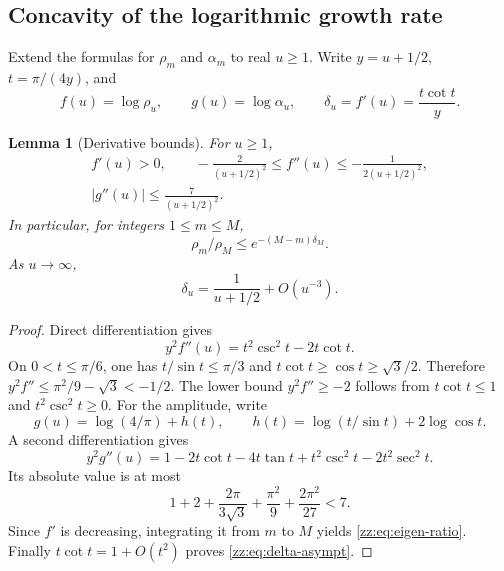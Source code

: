 \documentclass[11pt,a4paper]{article}
\newtheorem{lemma}[theorem]{Lemma}
\theoremstyle{definition}
\begin{document}
\subsection{Concavity of the logarithmic growth rate}
Extend the formulas for $\rho_m$ and $\alpha_m$ to real $u\ge1$.
Write $y=u+1/2$, $t=\pi/(4y)$, and
\[
 f(u)=\log\rho_u,\qquad g(u)=\log\alpha_u,\qquad
 \delta_u=f'(u)=\frac{t\cot t}{y}.
\]

\begin{lemma}[Derivative bounds]
\label{zz:lem:derivatives}
For $u\ge1$,
\begin{equation}\label{zz:eq:deriv-bounds}
 \begin{gathered}
 f'(u)>0,\qquad
 -\frac2{(u+1/2)^2}\le f''(u)\le-\frac1{2(u+1/2)^2},\\
 |g''(u)|\le\frac7{(u+1/2)^2}.
 \end{gathered}
\end{equation}
In particular, for integers $1\le m\le M$,
\begin{equation}\label{zz:eq:eigen-ratio}
 \rho_m/\rho_M\le e^{-(M-m)\delta_M}.
\end{equation}
As $u\to\infty$,
\begin{equation}\label{zz:eq:delta-asympt}
 \delta_u=\frac1{u+1/2}+O(u^{-3}).
\end{equation}
\end{lemma}
\begin{proof}
Direct differentiation gives
\[
 y^2f''(u)=t^2\csc^2t-2t\cot t.
\]
On $0<t\le\pi/6$, one has
$t/\sin t\le\pi/3$ and $t\cot t\ge\cos t\ge\sqrt3/2$.
Therefore
$y^2f''\le\pi^2/9-\sqrt3<-1/2$.
The lower bound $y^2f''\ge-2$ follows from $t\cot t\le1$ and
$t^2\csc^2t\ge0$.
For the amplitude, write
\[
 g(u)=\log(4/\pi)+h(t),\qquad
 h(t)=\log(t/\sin t)+2\log\cos t.
\]
A second differentiation gives
\[
 y^2g''(u)=1-2t\cot t-4t\tan t+t^2\csc^2t-2t^2\sec^2t.
\]
Its absolute value is at most
\[
 1+2+\frac{2\pi}{3\sqrt3}+\frac{\pi^2}{9}
    +\frac{2\pi^2}{27}<7.
\]
Since $f'$ is decreasing, integrating it from $m$ to $M$ yields
\eqref{zz:eq:eigen-ratio}.  Finally $t\cot t=1+O(t^2)$ proves
\eqref{zz:eq:delta-asympt}.
\end{proof}
\end{document}
